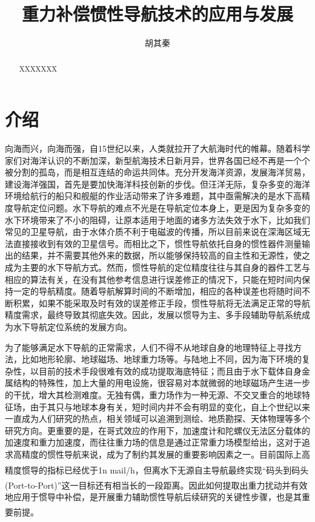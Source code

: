\documentclass[12pt,a4,utf8]{article}
\title{重力补偿惯性导航技术的应用与发展}
\author{胡其秦}
\newcommand{\upcite}[1]{\textsuperscript{\textsuperscript{\cite{#1}}}} %
\begin{document}
\maketitle

\begin{abstract}
      XXXXXXX
\end{abstract}

\section{介绍}

向海而兴，向海而强，自15世纪以来，人类就拉开了大航海时代的帷幕。随着科学家们对海洋认识的不断加深，新型航海技术日新月异，世界各国已经不再是一个个被分割的孤岛，而是相互连结的命运共同体。充分开发海洋资源，发展海洋贸易，建设海洋强国，首先是要加快海洋科技创新的步伐。但汪洋无际，复杂多变的海洋环境给航行的船只和舰艇的作业活动带来了许多难题，其中亟需解决的是水下高精度导航定位问题。水下导航的难点不光是在导航定位本身上，更是因为复杂多变的水下环境带来了不小的阻碍，让原本适用于地面的诸多方法失效于水下，比如我们常见的卫星导航，由于水体介质不利于电磁波的传播，所以目前来说在深海区域无法直接接收到有效的卫星信号。而相比之下，惯性导航依托自身的惯性器件测量输出的结果，并不需要其他外来的数据，所以能够保持较高的自主性和无源性，使之成为主要的水下导航方式。然而，惯性导航的定位精度往往与其自身的器件工艺与相应的算法有关，在没有其他参考信息进行误差修正的情况下，只能在短时间内保持一定的导航精度。随着导航解算时间的不断增加，相应的各种误差也将随时间不断积累，如果不能采取及时有效的误差修正手段，惯性导航将无法满足正常的导航精度需求，最终导致其彻底失效。因此，发展以惯导为主、多手段辅助导航系统成为水下导航定位系统的发展方向。

为了能够满足水下导航的正常需求，人们不得不从地球自身的地理特征上寻找方法，比如地形轮廓、地球磁场、地球重力场等。与陆地上不同，因为海下环境的复杂性，以目前的技术手段很难有效的成功提取海底特征；而且由于水下载体自身金属结构的特殊性，加上大量的用电设施，很容易对本就微弱的地球磁场产生进一步的干扰，增大其检测难度。无独有偶，重力场作为一种无源、不交叉重合的地球特征场，由于其只与地球本身有关，短时间内并不会有明显的变化，自上个世纪以来一直成为人们研究的热点，相关领域可以追溯到测绘、地质勘探、天体物理等多个研究方向。更重要的是，在哥式效应的作用下，加速度计和陀螺仪无法区分载体的加速度和重力加速度，而往往重力场的信息是通过正常重力场模型给出，这对于追求高精度的惯性导航来说，成为了制约其发展的重要影响因素之一。目前国际上高精度惯导的指标已经优于1n mail/h\upcite{article}，但离水下无源自主导航最终实现“码头到码头(Port-to-Port)”这一目标还有相当长的一段距离\upcite{moryl1997advanced}。因此如何提取出重力扰动并有效地应用于惯导中补偿，是开展重力辅助惯性导航后续研究的关键性步骤，也是其重要前提\upcite{WHCH20240724001}。
\end{document}
